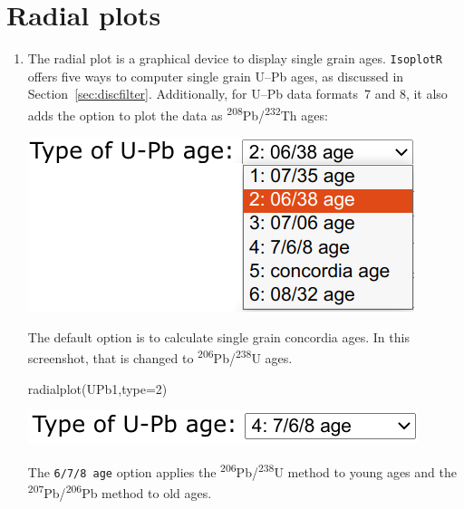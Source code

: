 \begin{refsection}
\begin{enumerate}
\end{enumerate}

\section{Radial plots}
\label{sec:UPbRadial}

\begin{enumerate}

\item The radial plot is a graphical device to display single grain
  ages. \texttt{IsoplotR} offers five ways to computer single grain
  U--Pb ages, as discussed in
  Section~\ref{sec:discfilter}. Additionally, for U--Pb data formats~7
  and 8, it also adds the option to plot the data as
  \textsuperscript{208}Pb/\textsuperscript{232}Th ages:

\noindent\begin{minipage}[t]{.35\linewidth}
  \strut\vspace*{-\baselineskip}\newline
  \includegraphics[width=\linewidth]{../figures/UPbRadialAgeTypes.png}
\end{minipage}
\begin{minipage}[t]{.65\linewidth}
  The default option is to calculate single grain concordia ages. In
  this screenshot, that is changed to
  \textsuperscript{206}Pb/\textsuperscript{238}U ages.
\end{minipage}

\begin{console}
radialplot(UPb1,type=2)
\end{console}

\noindent\begin{minipage}[t]{.4\linewidth}
  \strut\vspace*{-\baselineskip}\newline
  \includegraphics[width=\linewidth]{../figures/UPbRadial678age.png}
\end{minipage}
\begin{minipage}[t]{.6\linewidth}
  The \texttt{6/7/8 age} option applies the
  \textsuperscript{206}Pb/\textsuperscript{238}U method to young ages
  and the \textsuperscript{207}Pb/\textsuperscript{206}Pb method to
  old ages.
\end{minipage}


\end{enumerate}
\end{refsection}
